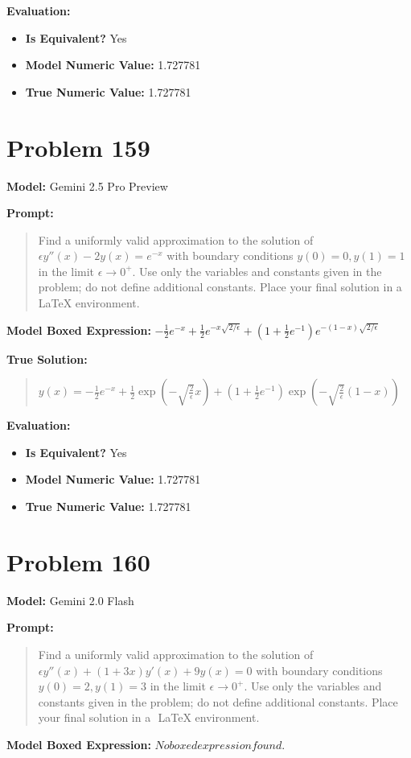 \documentclass{article}
\begin{document}
{\textbf{Evaluation:}
\begin{itemize}
\item \textbf{Is Equivalent?} Yes
\item \textbf{Model Numeric Value:} 1.727781
\item \textbf{True Numeric Value:} 1.727781
\end{itemize}
\vspace{1cm}
\section*{Problem 159}
\textbf{Model:} Gemini 2.5 Pro Preview

\textbf{Prompt:}
\begin{quote}
Find a uniformly valid approximation to the solution of $\epsilon y''(x) - 2y(x) = e^{-x}$ with boundary conditions $y(0)=0, y(1)=1$ in the limit $\epsilon \to 0^+$. Use only the variables and constants given in the problem; do not define additional constants. Place your final solution in a $\boxed{}$ LaTeX environment.
\end{quote}
\textbf{Model Boxed Expression:} $-\frac{1}{2}e^{-x} + \frac{1}{2}e^{-x\sqrt{2/\epsilon}} + \left(1 + \frac{1}{2}e^{-1}\right)e^{-(1-x)\sqrt{2/\epsilon}}$

\textbf{True Solution:}
\begin{quote}
$y(x) = -\frac{1}{2} e^{-x} + \frac{1}{2} \exp\left(-\sqrt{\frac{2}{\epsilon}}x\right) + \left(1 + \frac{1}{2} e^{-1}\right) \exp\left(-\sqrt{\frac{2}{\epsilon}}(1-x)\right)$
\end{quote}

\textbf{Evaluation:}
\begin{itemize}
\item \textbf{Is Equivalent?} Yes
\item \textbf{Model Numeric Value:} 1.727781
\item \textbf{True Numeric Value:} 1.727781
\end{itemize}
\vspace{1cm}
\section*{Problem 160}
\textbf{Model:} Gemini 2.0 Flash

\textbf{Prompt:}
\begin{quote}
Find a uniformly valid approximation to the solution of $\epsilon y''(x)+(1+3x)y'(x)+9y(x)=0$ with boundary conditions $y(0)=2,y(1)=3$ in the limit $\epsilon \to 0^+$. Use only the variables and constants given in the problem; do not define additional constants. Place your final solution in a $\boxed{}$ LaTeX environment.
\end{quote}
\textbf{Model Boxed Expression:} $No boxed expression found.$

}
\end{document}

